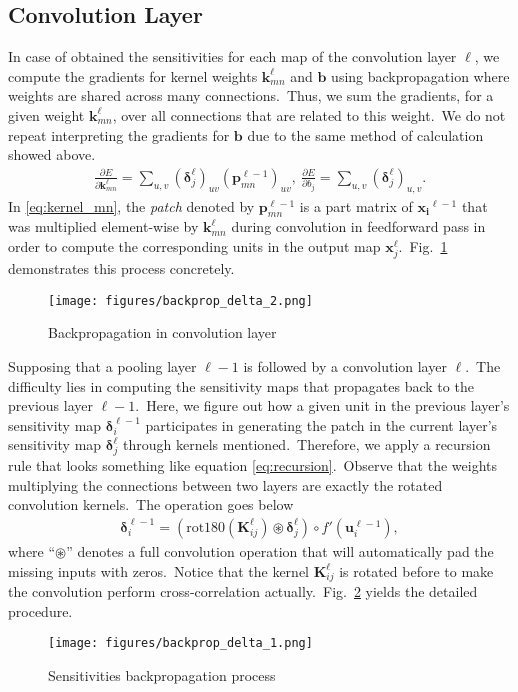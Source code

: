 \subsection{Convolution Layer} 
In case of obtained the sensitivities for each map of the convolution layer $\ell$, we compute the gradients for kernel weights $\bm{k}_{mn}^\ell$ and $\bm{b}$ using backpropagation where weights are shared across many connections.~Thus, we sum the gradients, for a given weight $\bm{k}_{mn}^\ell$, over all connections that are related to this weight.~We do not repeat interpreting the gradients for $\bm{b}$ due to the same method of calculation showed above.
\begin{align}
	\frac{\partial E}{\partial \bm{k}_{mn}^\ell} = \sum_{u,v} (\bm{\delta}_j^\ell)_{uv} (\bm{p}_{mn}^{\ell-1})_{uv},~\frac{\partial E}{\partial b_j} = \sum_{u,v} (\bm{\delta}_j^\ell)_{u,v}. \label{eq:kernel_mn}
\end{align}
In \eqref{eq:kernel_mn}, the \emph{patch} denoted by $\bm{p}_{mn}^{\ell-1}$ is a part matrix of $\bm{x_i}^{\ell-1}$ that was multiplied element-wise by $\bm{k}_{mn}^\ell$ during convolution in feedforward pass in order to compute the corresponding units in the output map $\bm{x}_j^{\ell}$.~Fig.~\ref{fig:kernel_mn} demonstrates this process concretely.
\begin{figure}[htbp]
	\centering
	\texttt{[image: figures/backprop\_delta\_2.png]}
	\caption{Backpropagation in convolution layer} \label{fig:kernel_mn}
\end{figure}

Supposing that a pooling layer $\ell-1$ is followed by a convolution layer $\ell$.~The difficulty lies in computing the sensitivity maps that propagates back to the previous layer $\ell-1$.~Here, we figure out how a given unit in the previous layer's sensitivity map $\bm{\delta}_i^{\ell-1}$ participates in generating the patch in the current layer's sensitivity map $\bm{\delta}_j^\ell$ through kernels mentioned.~Therefore, we apply a recursion rule that looks something like equation \eqref{eq:recursion}.~Observe that the weights multiplying the connections between two layers are exactly the rotated convolution kernels.~The operation goes below
\begin{align}
	\bm{\delta}_i^{\ell-1} = (\text{rot180}(\bm{K}_{ij}^\ell) \circledast \bm{\delta}_j^\ell) \circ f'(\bm{u}_i^{\ell-1}),
\end{align}
where ``$\circledast$'' denotes a full convolution operation that will automatically pad the missing inputs with zeros.~Notice that the kernel $\bm{K}_{ij}^\ell$ is rotated before to make the convolution perform cross-correlation actually.~Fig.~\ref{fig:delta_convolution} yields the detailed procedure.
\begin{figure}[htbp]
	\centering
	\texttt{[image: figures/backprop\_delta\_1.png]}
	\caption{Sensitivities backpropagation process} \label{fig:delta_convolution}
\end{figure}
